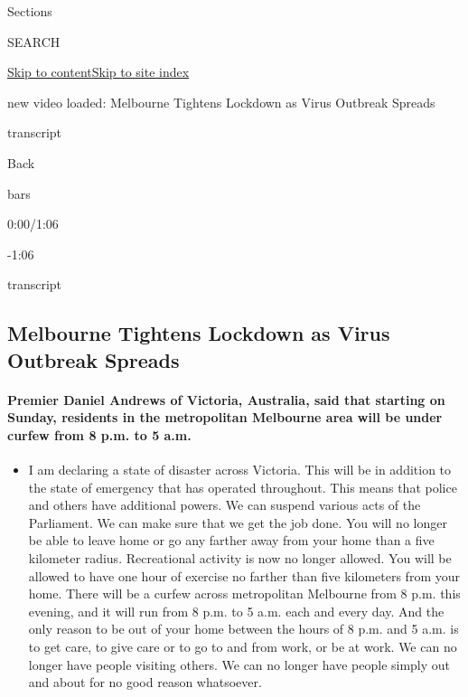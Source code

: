 Sections

SEARCH

\protect\hyperlink{site-content}{Skip to
content}\protect\hyperlink{site-index}{Skip to site index}

new video loaded: Melbourne Tightens Lockdown as Virus Outbreak Spreads

transcript

Back

bars

0:00/1:06

-1:06

transcript

\hypertarget{melbourne-tightens-lockdown-as-virus-outbreak-spreads}{%
\subsection{Melbourne Tightens Lockdown as Virus Outbreak
Spreads}\label{melbourne-tightens-lockdown-as-virus-outbreak-spreads}}

\hypertarget{premier-daniel-andrews-of-victoria-australia-said-that-starting-on-sunday-residents-in-the-metropolitan-melbourne-area-will-be-under-curfew-from-8-pm-to-5-am}{%
\paragraph{Premier Daniel Andrews of Victoria, Australia, said that
starting on Sunday, residents in the metropolitan Melbourne area will be
under curfew from 8 p.m. to 5
a.m.}\label{premier-daniel-andrews-of-victoria-australia-said-that-starting-on-sunday-residents-in-the-metropolitan-melbourne-area-will-be-under-curfew-from-8-pm-to-5-am}}

\begin{itemize}
\tightlist
\item
  I am declaring a state of disaster across Victoria. This will be in
  addition to the state of emergency that has operated throughout. This
  means that police and others have additional powers. We can suspend
  various acts of the Parliament. We can make sure that we get the job
  done. You will no longer be able to leave home or go any farther away
  from your home than a five kilometer radius. Recreational activity is
  now no longer allowed. You will be allowed to have one hour of
  exercise no farther than five kilometers from your home. There will be
  a curfew across metropolitan Melbourne from 8 p.m. this evening, and
  it will run from 8 p.m. to 5 a.m. each and every day. And the only
  reason to be out of your home between the hours of 8 p.m. and 5 a.m.
  is to get care, to give care or to go to and from work, or be at work.
  We can no longer have people visiting others. We can no longer have
  people simply out and about for no good reason whatsoever.
\end{itemize}

